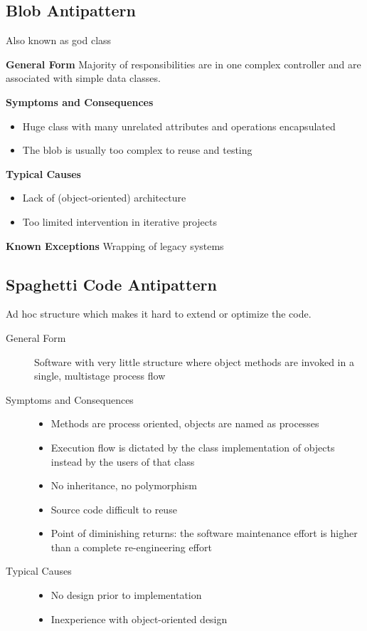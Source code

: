 \subsection{Blob Antipattern}
Also known as god class
\begin{description}
  \item \textbf{General Form} Majority of responsibilities are in one complex controller and are associated with simple data classes.
  \item \textbf{Symptoms and Consequences}
  \begin{itemize}
    \item Huge class with many unrelated attributes and operations encapsulated
    \item The blob is usually too complex to reuse and testing
  \end{itemize}
  \item \textbf{Typical Causes}
  \begin{itemize}
    \item Lack of (object-oriented) architecture
    \item Too limited intervention in iterative projects
  \end{itemize}
  \item \textbf{Known Exceptions} Wrapping of legacy systems
\end{description}
\newpage

\subsection{Spaghetti Code Antipattern}
Ad hoc structure which makes it hard to extend or optimize the code.
\begin{description}
  \item[General Form] Software with very little structure where object methods are invoked in a single, multistage process flow
  \item[Symptoms and Consequences] \hfill
  \begin{itemize}
    \item Methods are process oriented, objects are named as processes
    \item Execution flow is dictated by the class implementation of objects instead by the users of that class
    \item No inheritance, no polymorphism
    \item Source code difficult to reuse
    \item Point of diminishing returns: the software maintenance effort is higher than a complete re-engineering effort
  \end{itemize}
  \item[Typical Causes] \hfill
  \begin{itemize}
    \item No design prior to implementation
    \item Inexperience with object-oriented design
  \end{itemize}
\end{description}
\newpage

